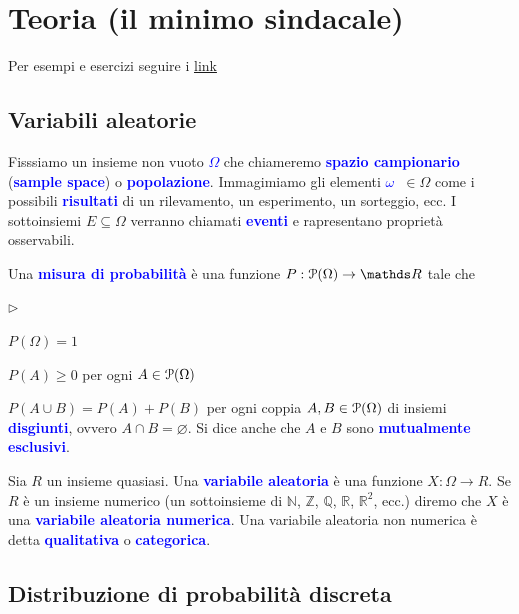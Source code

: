 \documentclass[10pt,openany]{book}
\def\RR{\mathds R}
\def\ZZ{\mathds Z}
\def\NN{\mathds N}
\def\QQ{\mathds Q}
\def\P{\EuScript P}
\def\0{\varnothing}
\newcommand{\mylabel}[1]{{\footnotesize\textsf{#1}}\hfill}
\renewenvironment{itemize}
  {\begin{list}{$\triangleright$}{%
   \setlength{\parskip}{0mm}
   \setlength{\topsep}{.2\baselineskip}
   \setlength{\rightmargin}{0mm}
   \setlength{\listparindent}{0mm}
   \setlength{\itemindent}{0mm}
   \setlength{\labelwidth}{3ex}
   \setlength{\itemsep}{.4\baselineskip}
   \setlength{\parsep}{0mm}
   \setlength{\partopsep}{0mm}
   \setlength{\labelsep}{1ex}
   \setlength{\leftmargin}{\labelwidth+\labelsep}
   \let\makelabel\mylabel}}{%
   \end{list}\vspace*{-1.3mm}}
\def\emph#1{\textcolor{blue}{\textbf{\boldmath #1}}}
\theoremstyle{mio}
\theoremstyle{liscio}
\begin{document}
\setlength{\abovedisplayskip}{-1ex}
\setlength{\belowdisplayskip}{0pt}




\chapter{Teoria (il minimo sindacale)}
\raggedbottom

Per esempi e esercizi seguire i \hyperref[ch2]{link \faShare}


\clearpage\section{Variabili aleatorie}


\def\medrel#1{\parbox[t]{6ex}{$\displaystyle\hfil #1$}}
\def\ceq#1#2#3{\parbox{25ex}{$\displaystyle #1$}\medrel{#2}$\displaystyle  #3$}


Fisssiamo un insieme non vuoto \emph{$\Omega$\/} che chiameremo \emph{spazio campionario\/}  (\emph{sample space\/}) o \emph{popolazione}. Immagimiamo gli elementi \emph{$\omega$\ }$\in\Omega$ come i possibili \emph{risultati\/} di un rilevamento, un esperimento, un sorteggio, ecc. I sottoinsiemi $E\subseteq\Omega$ verranno chiamati \emph{eventi\/} e rapresentano proprietà osservabili.

Una \emph{misura di probabilità\/} è una funzione $P:\P(\Omega)\to\RR$ tale che 

\begin{itemize}
\item $P(\Omega)=1$
\item $P(A)\ge0$ per ogni $A\in\P(\Omega)$
\item $P(A\cup B)=P(A)+P(B)$ per ogni coppia $A,B\in\P(\Omega)$ di insiemi \emph{disgiunti}, ovvero $A\cap B=\0$. Si dice anche che $A$ e $B$ sono \emph{mutualmente esclusivi}.
\end{itemize}

Sia $R$ un insieme quasiasi. Una \emph{variabile aleatoria\/} è una funzione $X:\Omega\to R$. Se $R$ è un insieme numerico (un sottoinsieme di $\NN$, $\ZZ$, $\QQ$, $\RR$, $\RR^2$, ecc.) diremo che $X$ è una \emph{variabile aleatoria numerica}. Una variabile aleatoria non numerica è detta \emph{qualitativa\/} o \emph{categorica}.


\clearpage\section{Distribuzione di probabilità discreta}
\end{document}
